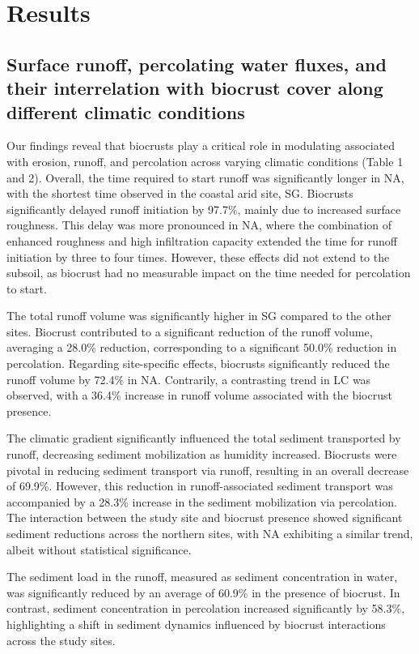 \section{Results}
\subsection{Surface runoff, percolating water fluxes, and their interrelation with biocrust cover along different climatic conditions}

Our findings reveal that biocrusts play a critical role in modulating associated with erosion, runoff, and percolation across varying climatic conditions (Table 1 and 2). Overall, the time required to start runoff was significantly longer in NA, with the shortest time observed in the coastal arid site, SG. Biocrusts significantly delayed runoff initiation by 97.7\%, mainly due to increased surface roughness. This delay was more pronounced in NA, where the combination of enhanced roughness and high infiltration capacity extended the time for runoff initiation by three to four times. However, these effects did not extend to the subsoil, as biocrust had no measurable impact on the time needed for percolation to start.

The total runoff volume was significantly higher in SG compared to the other sites. Biocrust contributed to a significant reduction of the runoff volume, averaging a 28.0\% reduction, corresponding to a significant 50.0\% reduction in percolation. Regarding site-specific effects, biocrusts significantly reduced the runoff volume by 72.4\% in NA. Contrarily, a contrasting trend in LC was observed, with a 36.4\% increase in runoff volume associated with the biocrust presence.

The climatic gradient significantly influenced the total sediment transported by runoff, decreasing sediment mobilization as humidity increased. Biocrusts were pivotal in reducing sediment transport via runoff, resulting in an overall decrease of 69.9\%. However, this reduction in runoff-associated sediment transport was accompanied by a 28.3\% increase in the sediment mobilization via percolation. The interaction between the study site and biocrust presence showed significant sediment reductions across the northern sites, with NA exhibiting a similar trend, albeit without statistical significance.

The sediment load in the runoff, measured as sediment concentration in water, was significantly reduced by an average of 60.9\% in the presence of biocrust. In contrast, sediment concentration in percolation increased significantly by 58.3\%, highlighting a shift in sediment dynamics influenced by biocrust interactions across the study sites.

